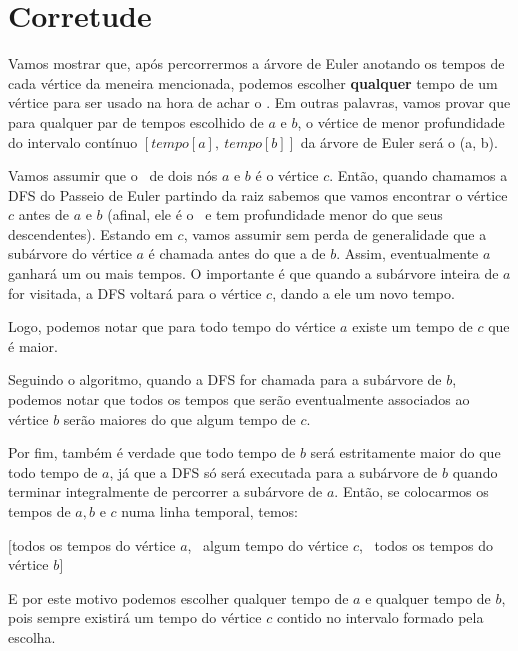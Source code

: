 \section{Corretude}

Vamos mostrar que, após percorrermos a árvore de Euler anotando os tempos de cada vértice da meneira mencionada, podemos escolher \textbf{qualquer} tempo de um vértice para ser usado na hora de achar o \LCA. Em outras palavras, vamos provar que para qualquer par de tempos escolhido de $a$ e $b$, o vértice de menor profundidade do intervalo contínuo $[tempo[a],\ tempo[b]]$ da árvore de Euler será o \LCA(a, b).

\vspace{0.5cm}

Vamos assumir que o \LCA\ de dois nós $a$ e $b$ é o vértice $c$. Então, quando chamamos a DFS do Passeio de Euler partindo da raiz sabemos que vamos encontrar o vértice $c$ antes de $a$ e $b$ (afinal, ele é o \LCA\ e tem profundidade menor do que seus descendentes). Estando em $c$, vamos assumir sem perda de generalidade que a subárvore do vértice $a$ é chamada antes do que a de $b$. Assim, eventualmente $a$ ganhará um ou mais tempos. O importante é que quando a subárvore inteira de $a$ for visitada, a DFS voltará para o vértice $c$, dando a ele um novo tempo.

Logo, podemos notar que para todo tempo do vértice $a$ existe um tempo de $c$ que é maior.

Seguindo o algoritmo, quando a DFS for chamada para a subárvore de $b$, podemos notar que todos os tempos que serão eventualmente associados ao vértice $b$ serão maiores do que algum tempo de $c$.

Por fim, também é verdade que todo tempo de $b$ será estritamente maior do que todo tempo de $a$, já que a DFS só será executada para a subárvore de $b$ quando terminar integralmente de percorrer a subárvore de $a$. Então, se colocarmos os tempos de $a, b$ e $c$ numa linha temporal, temos:

\begin{center}
    $[$todos os tempos do vértice $a$, \ algum tempo do vértice $c$, \ todos os tempos do vértice $b]$
\end{center}

E por este motivo podemos escolher qualquer tempo de $a$ e qualquer tempo de $b$, pois sempre existirá um tempo do vértice $c$ contido no intervalo formado pela escolha.

\vspace{0.5cm}

